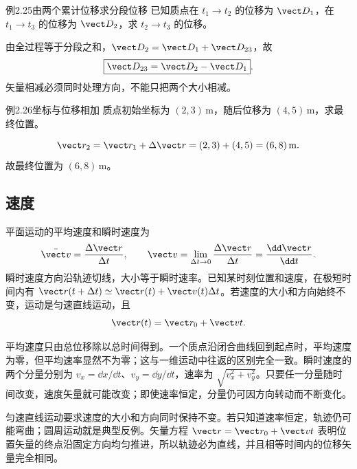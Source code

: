 \begin{origexamplebox}{例2.25\quad 由两个累计位移求分段位移}
已知质点在 $t_1\to t_2$ 的位移为 $\vect D_1$，在 $t_1\to t_3$ 的位移为 $\vect D_2$，求 $t_2\to t_3$ 的位移。
\end{origexamplebox}
\begin{xesolution}
由全过程等于分段之和，$\vect D_2=\vect D_1+\vect D_{23}$，故
\[
  \boxed{\vect D_{23}=\vect D_2-\vect D_1}.
\]
矢量相减必须同时处理方向，不能只把两个大小相减。
\end{xesolution}

\begin{origexamplebox}{例2.26\quad 坐标与位移相加}
质点初始坐标为 $(2,3)\,\mathrm m$，随后位移为 $(4,5)\,\mathrm m$，求最终位置。
\end{origexamplebox}
\begin{xesolution}
\[
\vect r_2=\vect r_1+\Delta\vect r=(2,3)+(4,5)=(6,8)\,\mathrm m.
\]
故最终位置为 $\boxed{(6,8)\,\mathrm m}$。
\end{xesolution}

\subsection{速度}

平面运动的平均速度和瞬时速度为
\begin{equation}
\bar{\vect v}=\frac{\Delta\vect r}{\Delta t},\qquad
\vect v=\lim_{\Delta t\to0}\frac{\Delta\vect r}{\Delta t}=\frac{\dd\vect r}{\dd t}.
\end{equation}
瞬时速度方向沿轨迹切线，大小等于瞬时速率。已知某时刻位置和速度，在极短时间内有 $\vect r(t+\Delta t)\simeq\vect r(t)+\vect v(t)\Delta t$。若速度的大小和方向始终不变，运动是匀速直线运动，且
\begin{equation}
  \vect r(t)=\vect r_0+\vect vt.
\end{equation}

平均速度只由总位移除以总时间得到。一个质点沿闭合曲线回到起点时，平均速度为零，但平均速率显然不为零；这与一维运动中往返的区别完全一致。瞬时速度的两个分量分别为 $v_x=\dd x/\dd t$、$v_y=\dd y/\dd t$，速率为 $\sqrt{v_x^2+v_y^2}$。只要任一分量随时间改变，速度矢量就可能改变；即使速率恒定，分量仍可因方向转动而不断变化。

匀速直线运动要求速度的大小和方向同时保持不变。若只知道速率恒定，轨迹仍可能弯曲；圆周运动就是典型反例。矢量方程 $\vect r=\vect r_0+\vect vt$ 表明位置矢量的终点沿固定方向均匀推进，所以轨迹必为直线，并且相等时间内的位移矢量完全相同。

\CurveVelocityDiagram

